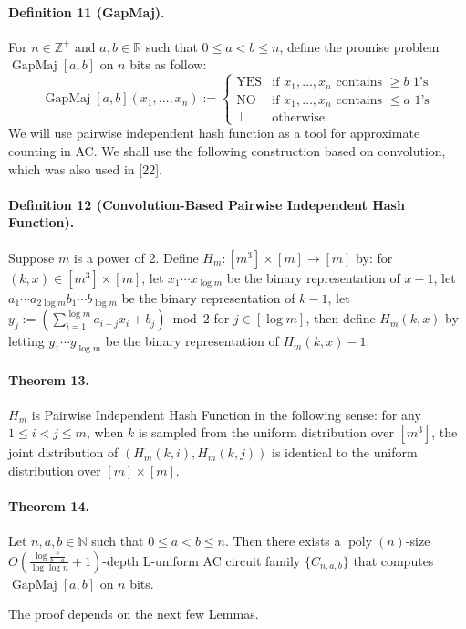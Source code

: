 \documentclass[10pt,a4paper]{article}
\begin{document}
\paragraph{Definition 11 (GapMaj).} For $n\in\mathbb Z^+$ and $a,b\in\mathbb R$ such that $0\le a<b\le n$, define the promise problem $\operatorname{GapMaj}[a,b]$ on $n$ bits as follow:
\[\operatorname{GapMaj}[a,b](x_1,\ldots,x_n):=\begin{cases}\mathrm{YES}&\text{if }x_1,\ldots,x_n\text{ contains }\ge b\text{ 1's}\\\mathrm{NO}&\text{if }x_1,\ldots,x_n\text{ contains }\le a\text{ 1's}\\\bot&\text{otherwise.}\end{cases}\]
We will use pairwise independent hash function as a tool for approximate counting in AC. We shall use the following construction based on convolution, which was also used in [22].
\paragraph{Definition 12 (Convolution-Based Pairwise Independent Hash Function).} Suppose $m$ is a power of 2. Define $H_m:[m^3]\times[m]\to[m]$ by: for $(k,x)\in[m^3]\times[m]$, let $x_1\cdots x_{\log m}$ be the binary representation of $x-1$, let $a_1\cdots a_{2\log m}b_1\cdots b_{\log m}$ be the binary representation of $k-1$, let $y_j:=(\sum_{i=1}^{\log m}a_{i+j}x_i+b_j)\bmod2$ for $j\in[\log m]$, then define $H_m(k,x)$ by letting $y_1\cdots y_{\log m}$ be the binary representation of $H_m(k,x)-1$.
\paragraph{Theorem 13.} $H_m$ is Pairwise Independent Hash Function in the following sense: for any $1\le i<j\le m$, when $k$ is sampled from the uniform distribution over $[m^3]$, the joint distribution of $(H_m(k,i),H_m(k,j))$ is identical to the uniform distribution over $[m]\times[m]$.

\paragraph{Theorem 14.} Let $n,a,b\in\mathbb N$ such that $0\le a<b\le n$. Then there exists a $\operatorname{poly}(n)$-size $O\left(\frac{\log\frac b{b-a}}{\log\log n}+1\right)$-depth L-uniform AC circuit family $\{C_{n,a,b}\}$ that computes $\operatorname{GapMaj}[a,b]$ on $n$ bits.

The proof depends on the next few Lemmas.
\end{document}
